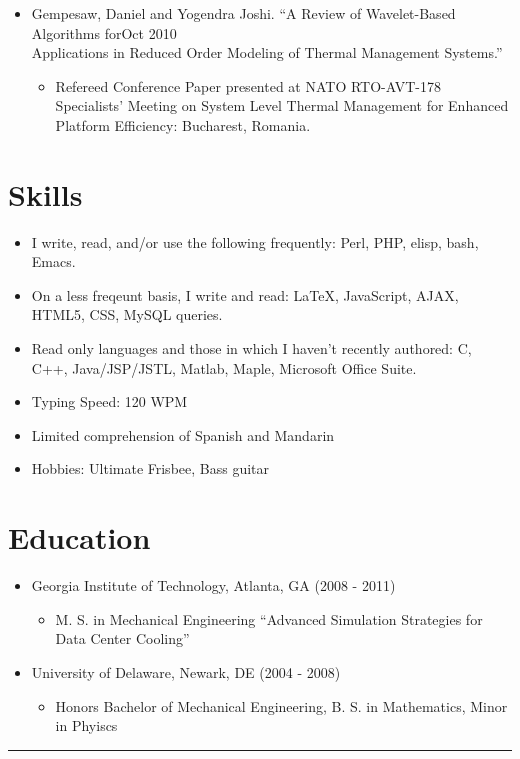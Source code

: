 \documentclass[10pt]{article}
\newenvironment{myitem}{
\begin{itemize}
  \setlength{\itemsep}{1pt}
  \setlength{\parskip}{0pt}
  \setlength{\parsep}{0pt}
}{\end{itemize}}
\begin{document}
\begin{myitem}
  \item Gempesaw, Daniel and Yogendra Joshi. ``A Review of Wavelet-Based Algorithms for\hfill Oct 2010\\ 
Applications in Reduced Order Modeling of Thermal Management Systems.''
  \begin{myitem}
    \item Refereed Conference Paper presented at NATO RTO-AVT-178 Specialists' Meeting on System Level Thermal Management for Enhanced Platform Efficiency: Bucharest, Romania. 
  \end{myitem}
\end{myitem}

\vspace{-.55cm}
\section{Skills}
\vspace{-0.25cm}
\begin{myitem}
\item I write, read, and/or use the following frequently: Perl, PHP, elisp, bash, Emacs.
\item On a less freqeunt basis, I write and read: \LaTeX, JavaScript, AJAX, HTML5, CSS, MySQL queries.
\item Read only languages and those in which I haven't recently authored: C, C++, Java/JSP/JSTL, Matlab, Maple, Microsoft Office Suite.
\item Typing Speed: 120 WPM
\item Limited comprehension of Spanish and Mandarin
\item Hobbies: Ultimate Frisbee, Bass guitar
\end{myitem}

\section{Education}
\vspace{-0.25cm}
\begin{myitem}
  \item Georgia Institute of Technology, Atlanta, GA \hfill (2008 - 2011)
  \begin{myitem}
    \item M. S. in Mechanical Engineering ``Advanced Simulation Strategies for Data Center Cooling''
  \end{myitem}
  \item University of Delaware, Newark, DE \hfill (2004 - 2008)
  \begin{myitem}
    \item Honors Bachelor of Mechanical Engineering, B. S. in Mathematics, Minor in Phyiscs
  \end{myitem}
\end{myitem}
%
\vfill
\hrule
\end{document}
